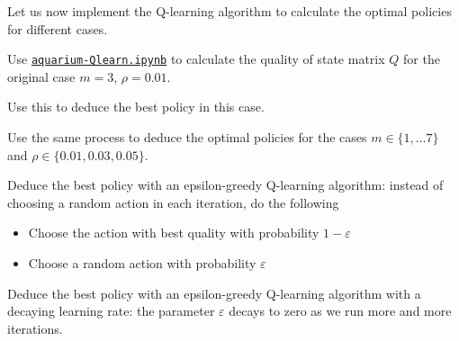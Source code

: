 \begin{slide}
Let us now implement the Q-learning algorithm to calculate the optimal policies for different cases.

\begin{parts}
	\item Use \href{https://utoronto.syzygy.ca/jupyter/user-redirect/git-pull?repo=https://github.com/bigfatbernie/IBLMathModeling&subPath=book/python/aquarium-Qlearn.ipynb}{\tt aquarium-Qlearn.ipynb} to calculate the quality of state matrix $Q$ for the original case $m=3$, $\rho=0.01$.
	\item Use this to deduce the best policy in this case.
	\item Use the same process to deduce the optimal policies for the cases $m \in \{1, \ldots 7\}$ and $\rho \in \{0.01, 0.03, 0.05\}$. \\
	
	

	\item Deduce the best policy with an epsilon-greedy Q-learning algorithm: instead of choosing a random action in each iteration, do the following
	\begin{itemize}
		\item Choose the action with best quality with probability $1-\varepsilon$
		\item Choose a random action with probability $\varepsilon$
	\end{itemize}
	\item Deduce the best policy with an epsilon-greedy Q-learning algorithm with a decaying learning rate: the parameter $\varepsilon$ decays to zero as we run more and more iterations.
\end{parts}
\end{slide}



